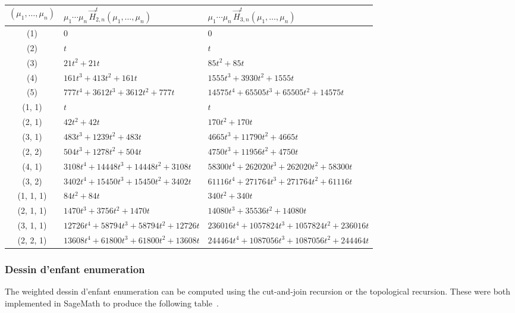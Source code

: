 \documentclass[a4paper]{article}
\theoremstyle{plain}
\numberwithin{theorem}{section}
\theoremstyle{definition}
\theoremstyle{remark}
\newcommand{\HN}[3]{\vec{H}^t_{#1,#2}(#3)}
\begin{document}
~

\begin{center}
\begin{tabularx}{\textwidth}{cXX} \toprule
$(\mu_1, \ldots, \mu_n)$ & $\mu_1 \cdots \mu_n \, \HN{2}{n}{\mu_1, \ldots, \mu_n}$ & $\mu_1 \cdots \mu_n \, \HN{3}{n}{\mu_1, \ldots, \mu_n}$ \\ \midrule
(1) & $0$ & $0$ \\
(2) & $t$ & $t$ \\
(3) & $21t^2 + 21t$ & $85t^2 + 85t$ \\
(4) & $161t^3 + 413t^2 + 161t$ & $1555t^3 + 3930t^2 + 1555t$ \\
(5) & $777t^4 + 3612t^3 + 3612t^2 + 777t$ & $14575t^4 + 65505t^3 + 65505t^2 + 14575t$ \\ \midrule
(1, 1) & $t$ & $t$ \\
(2, 1) & $42t^2 + 42t$ & $170t^2 + 170t$ \\
(3, 1) & $483t^3 + 1239t^2 + 483t$ & $4665t^3 + 11790t^2 + 4665t$ \\
(2, 2) & $504t^3 + 1278t^2 + 504t$ & $4750t^3 + 11956t^2 + 4750t$ \\
(4, 1) & $3108t^4 + 14448t^3 + 14448t^2 + 3108t$ & $58300t^4 + 262020t^3 + 262020t^2 + 58300t$ \\
(3, 2) & $3402t^4 + 15450t^3 + 15450t^2 + 3402t$ & $61116t^4 + 271764t^3 + 271764t^2 + 61116t$ \\ \midrule
(1, 1, 1) & $84t^2 + 84t$ & $340t^2 + 340t$ \\
(2, 1, 1) & $1470t^3 + 3756t^2 + 1470t$ & $14080t^3 + 35536t^2 + 14080t$ \\
(3, 1, 1) & $12726t^4 + 58794t^3 + 58794t^2 + 12726t$ & $236016t^4 + 1057824t^3 + 1057824t^2 + 236016t$ \\
(2, 2, 1) & $13608t^4 + 61800t^3 + 61800t^2 + 13608t$ & $244464t^4 + 1087056t^3 + 1087056t^2 + 244464t$ \\ \bottomrule
\end{tabularx}
\end{center}



\subsubsection*{Dessin d'enfant enumeration}

The weighted dessin d'enfant enumeration can be computed using the cut-and-join recursion or the topological recursion. These were both implemented in SageMath to produce the following table~\cite{sagemath}.
\end{document}

